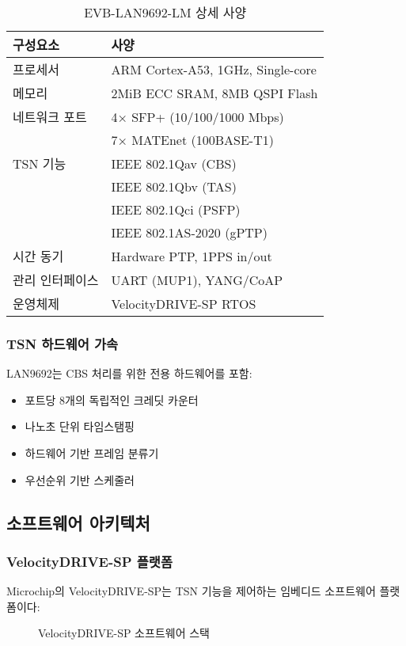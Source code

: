 \documentclass[10pt,twocolumn]{IEEEtran}
\begin{document}
\begin{table}[h]
\centering
\caption{EVB-LAN9692-LM 상세 사양}
\begin{tabular}{ll}
\toprule
\textbf{구성요소} & \textbf{사양} \\
\midrule
프로세서 & ARM Cortex-A53, 1GHz, Single-core \\
메모리 & 2MiB ECC SRAM, 8MB QSPI Flash \\
네트워크 포트 & 4× SFP+ (10/100/1000 Mbps) \\
& 7× MATEnet (100BASE-T1) \\
TSN 기능 & IEEE 802.1Qav (CBS) \\
& IEEE 802.1Qbv (TAS) \\
& IEEE 802.1Qci (PSFP) \\
& IEEE 802.1AS-2020 (gPTP) \\
시간 동기 & Hardware PTP, 1PPS in/out \\
관리 인터페이스 & UART (MUP1), YANG/CoAP \\
운영체제 & VelocityDRIVE-SP RTOS \\
\bottomrule
\end{tabular}
\end{table}

\subsubsection{TSN 하드웨어 가속}
LAN9692는 CBS 처리를 위한 전용 하드웨어를 포함:
\begin{itemize}
\item 포트당 8개의 독립적인 크레딧 카운터
\item 나노초 단위 타임스탬핑
\item 하드웨어 기반 프레임 분류기
\item 우선순위 기반 스케줄러
\end{itemize}

\subsection{소프트웨어 아키텍처}

\subsubsection{VelocityDRIVE-SP 플랫폼}
Microchip의 VelocityDRIVE-SP는 TSN 기능을 제어하는 임베디드 소프트웨어 플랫폼이다:

\begin{figure}[h]
\centering
{}
\caption{VelocityDRIVE-SP 소프트웨어 스택}
\end{figure}
\end{document}
